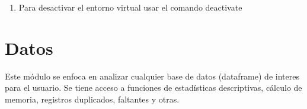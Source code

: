 \documentclass[letterpaper,10pt,openany,spanish]{sphinxmanual}
\begin{document}
\begin{enumerate}
\begin{quote}
\begin{sphinxVerbatim}[commandchars=\\\{\}]
\end{sphinxVerbatim}
\end{quote}

\item {} 
Para desactivar el entorno virtual usar el comando deactivate
\begin{quote}

\begin{sphinxVerbatim}[commandchars=\\\{\}]
\end{sphinxVerbatim}
\end{quote}

\end{enumerate}


\chapter{Datos}
\label{\detokenize{datos:datos}}\label{\detokenize{datos:id1}}\label{\detokenize{datos::doc}}
Este módulo se enfoca en analizar cualquier base de datos (dataframe) de interes para el usuario. Se tiene acceso a funciones de estadísticas descriptivas, cálculo de memoria, registros duplicados, faltantes y otras.

\label{\detokenize{datos:module-datos}}
\end{document}
